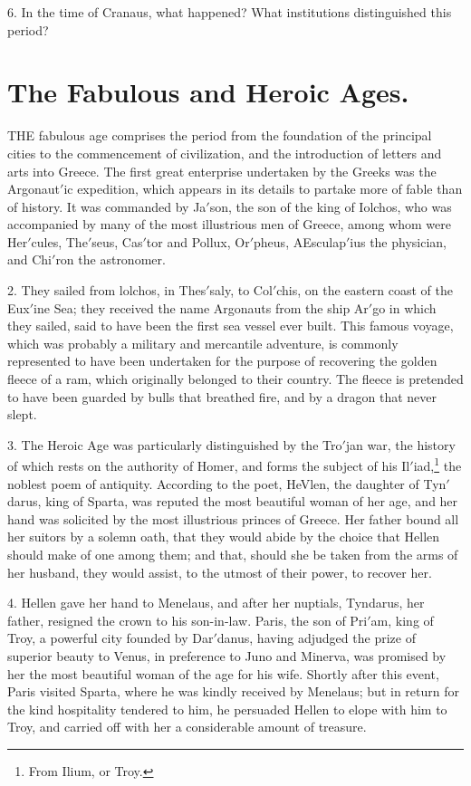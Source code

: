 \documentclass[openany,a4paper]{memoir}
\begin{document}
6. In the time of Cranaus, what happened? What 
institutions distinguished this period? 





\chapter{The Fabulous and Heroic Ages.} 

THE fabulous age comprises the period from the foundation of the principal cities to the commencement of civilization, and the introduction of letters and arts into Greece. 
The first great enterprise undertaken by the Greeks was the 
Argonaut$'$ic expedition, which appears in its details to partake more of fable than of history. It was commanded by 
Ja$'$son, the son of the king of Iolchos, who was accompanied by many of the most illustrious men of Greece, 
among whom were Her$'$cules, The$'$seus, Cas$'$tor and Pollux, Or$'$pheus, AEsculap$'$ius the physician, and Chi$'$ron the 
astronomer. 

2. They sailed from lolchos, in Thes$'$saly, to Col$'$chis, on 
the eastern coast of the Eux$'$ine Sea; they received the 
name Argonauts from the ship Ar$'$go in which they sailed, 
said to have been the first sea vessel ever built. This famous 
voyage, which was probably a military and mercantile adventure, is commonly represented to have been undertaken 
for the purpose of recovering the golden fleece of a ram, 
which originally belonged to their country. The fleece is 
pretended to have been guarded by bulls that breathed fire, 
and by a dragon that never slept. 

3. The Heroic Age was particularly distinguished by the 
Tro$'$jan war, the history of which rests on the authority of 
Homer, and forms the subject of his Il$'$iad,\footnote{From Ilium, or Troy.} the noblest poem 
of antiquity. According to the poet, HeVlen, the daughter 
of Tyn$'$darus, king of Sparta, was reputed the most beautiful woman of her age, and her hand was solicited by the 
most illustrious princes of Greece. Her father bound all her 
suitors by a solemn oath, that they would abide by the choice 
that Hellen should make of one among them; and that, 
should she be taken from the arms of her husband, they would 
assist, to the utmost of their power, to recover her. 


4. Hellen gave her hand to Menelaus, and after her nuptials, Tyndarus, her father, resigned the crown to his son-in-law. Paris, the son of Pri$'$am, king of Troy, a powerful city 
founded by Dar$'$danus, having adjudged the prize of superior beauty to Venus, in preference to Juno and Minerva, was 
promised by her the most beautiful woman of the age for 
his wife. Shortly after this event, Paris visited Sparta, 
where he was kindly received by Menelaus; but in return 
for the kind hospitality tendered to him, he persuaded Hellen 
to elope with him to Troy, and carried off with her a considerable amount of treasure. 
\end{document}
